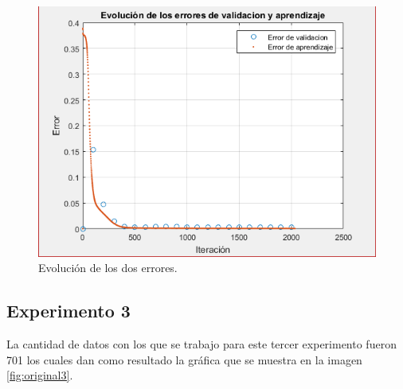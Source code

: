 \begin{figure}[H]
    \begin{center}
        \includegraphics[width=12cm]{2/error.png}
        \caption{Evolución de los dos errores.}
        \label{fig:error2}
    \end{center}
\end{figure}

\newpage

\subsection{Experimento 3}
La cantidad de datos con los que se trabajo para este tercer experimento fueron 701 los cuales dan como resultado la gráfica que se muestra en la imagen \ref{fig:original3}.

